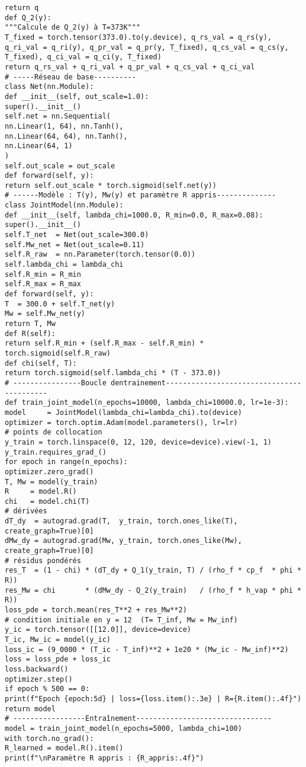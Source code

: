 \documentclass[12pt, oneside]{report} %
\theoremstyle{definition}
\theoremstyle{remark}
\begin{document}
\begin{lstlisting}[style=pythonstyle]
return q
def Q_2(y):
"""Calcule de Q_2(y) à T=373K"""
T_fixed = torch.tensor(373.0).to(y.device), q_rs_val = q_rs(y), q_ri_val = q_ri(y), q_pr_val = q_pr(y, T_fixed), q_cs_val = q_cs(y, T_fixed), q_ci_val = q_ci(y, T_fixed)
return q_rs_val + q_ri_val + q_pr_val + q_cs_val + q_ci_val
# -----Réseau de base----------
class Net(nn.Module):
def __init__(self, out_scale=1.0):
super().__init__()
self.net = nn.Sequential(
nn.Linear(1, 64), nn.Tanh(),
nn.Linear(64, 64), nn.Tanh(),
nn.Linear(64, 1)
)
self.out_scale = out_scale
def forward(self, y):
return self.out_scale * torch.sigmoid(self.net(y))
# ------Modèle : T(y), Mw(y) et paramètre R appris--------------
class JointModel(nn.Module):
def __init__(self, lambda_chi=1000.0, R_min=0.0, R_max=0.08):
super().__init__()
self.T_net  = Net(out_scale=300.0)
self.Mw_net = Net(out_scale=0.11)
self.R_raw  = nn.Parameter(torch.tensor(0.0))
self.lambda_chi = lambda_chi
self.R_min = R_min
self.R_max = R_max
def forward(self, y):
T  = 300.0 + self.T_net(y)
Mw = self.Mw_net(y)
return T, Mw
def R(self):
return self.R_min + (self.R_max - self.R_min) * torch.sigmoid(self.R_raw)
def chi(self, T):
return torch.sigmoid(self.lambda_chi * (T - 373.0))
# ----------------Boucle dentrainement------------------------------------------
def train_joint_model(n_epochs=10000, lambda_chi=10000.0, lr=1e-3):
model     = JointModel(lambda_chi=lambda_chi).to(device)
optimizer = torch.optim.Adam(model.parameters(), lr=lr)
# points de collocation
y_train = torch.linspace(0, 12, 120, device=device).view(-1, 1)
y_train.requires_grad_()
for epoch in range(n_epochs):
optimizer.zero_grad()
T, Mw = model(y_train)
R     = model.R()
chi   = model.chi(T)
# dérivées
dT_dy  = autograd.grad(T,  y_train, torch.ones_like(T),  create_graph=True)[0]
dMw_dy = autograd.grad(Mw, y_train, torch.ones_like(Mw), create_graph=True)[0]
# résidus pondérés
res_T  = (1 - chi) * (dT_dy + Q_1(y_train, T) / (rho_f * cp_f  * phi * R))
res_Mw = chi       * (dMw_dy - Q_2(y_train)   / (rho_f * h_vap * phi * R))
loss_pde = torch.mean(res_T**2 + res_Mw**2)
# condition initiale en y = 12  (T= T_inf, Mw = Mw_inf)
y_ic = torch.tensor([[12.0]], device=device)
T_ic, Mw_ic = model(y_ic)
loss_ic = (9_0000 * (T_ic - T_inf)**2 + 1e20 * (Mw_ic - Mw_inf)**2)
loss = loss_pde + loss_ic
loss.backward()
optimizer.step()
if epoch % 500 == 0:
print(f"Epoch {epoch:5d} | loss={loss.item():.3e} | R={R.item():.4f}")
return model
# -----------------Entraînement--------------------------------
model = train_joint_model(n_epochs=5000, lambda_chi=100)
with torch.no_grad():
R_learned = model.R().item()
print(f"\nParamètre R appris : {R_appris:.4f}")

\end{lstlisting}
\end{document}
